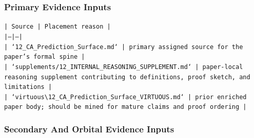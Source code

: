 \documentclass[11pt]{article}
\begin{document}
\subsubsection*{Primary Evidence Inputs}

\noindent\texttt{| Source | Placement reason |}\\
\noindent\texttt{|---|---|}\\
\noindent\texttt{| `12\_CA\_Prediction\_Surface.md` | primary assigned source for the paper's formal spine |}\\
\noindent\texttt{| `supplements/12\_INTERNAL\_REASONING\_SUPPLEMENT.md` | paper-local reasoning supplement contributing to definitions, proof sketch, and limitations |}\\
\noindent\texttt{| `virtuous\textbackslash{}12\_CA\_Prediction\_Surface\_VIRTUOUS.md` | prior enriched paper body; should be mined for mature claims and proof ordering |}\\

\subsubsection*{Secondary And Orbital Evidence Inputs}
\end{document}
